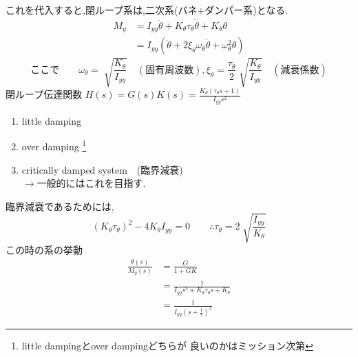 \documentclass[class=article, crop=false, dvipdfmx]{standalone}
\begin{document}
これを代入すると,閉ループ系は,二次系(バネ+ダンパー系)となる.
\begin{align}
M_y
&=
I_{yy}\ddot{\theta}+
K_{\theta}\tau_{\theta}\dot{\theta}+K_{\theta}\theta
\\
&=
I_{yy}
(\ddot{\theta}+
2\xi_{\theta}\omega_{\theta}\dot{\theta}
+\omega^2_{\theta}\theta)
\end{align}
\begin{equation}
\text{ここで}
\qquad
\omega_{\theta}=
\sqrt[]{\frac{K_{\theta}}{I_{yy}}}\quad
(\text{固有周波数}),
\xi_{\theta}=
\frac{\tau_{\theta}}{2}
\sqrt[]{\frac{K_{\theta}}{I_{yy}}}
\quad( \text{減衰係数})
\end{equation}
閉ループ伝達関数
$
H(s)=G(s)K(s)=
\frac{K_{\theta}(\tau_{\theta}s+1)}{I_{yy}s^2}
$



\begin{enumerate}[label=\maru{\theenumi}]
\item little damping
\item over damping
\footnote{little dampingとover dampingどちらが
良いのかはミッション次第}
\item critically damped system　(臨界減衰)\\
$\rightarrow$一般的にはこれを目指す.
\end{enumerate}
臨界減衰であるためには,
\begin{equation}
(K_{\theta}\tau_{\theta})^2
-4K_{\theta}I_{yy}=0\qquad
\therefore
\tau_{\theta}=2
\sqrt[]{\frac{I_{yy}}{K_{\theta}}}
\end{equation}
この時の系の挙動
\begin{align}
\frac{\theta(s)}{M_{y}(s)}&=\frac{G}{1+GK}\\
&=
\frac{1}
{I_{yy}s^2+K_{\theta}\tau_{\theta}s+K_{\theta}}\\
&=
\frac{1}{I_{yy}(s+\frac{1}{\tau})^2}
\end{align}







\end{document}
